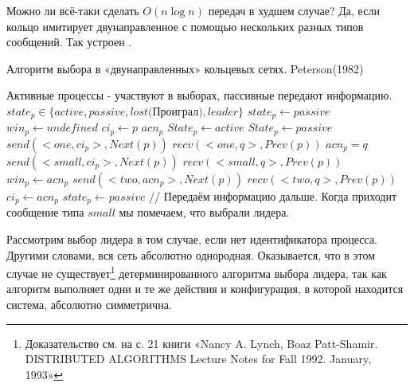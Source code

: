 Можно ли всё-таки сделать $O(n\log n)$ передач в худшем случае? Да, если кольцо имитирует двунаправленное с помощью нескольких разных типов сообщений. Так устроен .
\begin{algorithm}
\caption{Алгоритм выбора в «двунаправленных» кольцевых сетях. Peterson(1982)}
\label{algPeterson}
\begin{algorithmic}
\State Активные процессы - участвуют в выборах, пассивные передают информацию. 
\State $state_p \in \{active, passive, lost\text{(Проиграл)}, leader\}$ 
\State $state_p \gets passive$
\State $win_p \gets undefined$ 
\State $ci_p \gets p$ 
\State $acn_p$ 
    \State $State_p \gets active$
\Else 
    \State $State_p \gets passive$
\EndIf
{}
    \State $send(<one, ci_p>, Next(p))$ 
    \State $recv(<one, q>, Prev(p))$
    \State $acn_p = q$
     
        \State $send(<small, ci_p>, Next(p))$ 
        \State $recv(<small, q>, Prev(p))$ 
        \State $win_p \gets acn_p$
    \Else {}
        \State $send(<two, acn_p>, Next(p))$
        \State $recv(<two, q>, Prev(p))$
         
            \State $ci_p \gets acn_p$
        \Else 
            \State $state_p \gets passive$ 
        \EndIf
    \EndIf
\EndWhile
{} 
    \State // Передаём информацию дальше.
\EndIf
\State Когда приходит сообщение типа $small$ мы помечаем, что выбрали лидера.
\end{algorithmic}
\end{algorithm}

Рассмотрим выбор лидера в том случае, если нет идентификатора процесса. Другими словами, вся сеть абсолютно однородная. Оказывается, что в этом случае не существует\footnote{Доказательство см. на с. 21 книги «Nancy A. Lynch, Boaz Patt-Shamir. DISTRIBUTED ALGORITHMS Lecture Notes for Fall 1992. January, 1993»} детерминированного алгоритма выбора лидера, так как алгоритм выполняет одни и те же действия и конфигурация, в которой находится система, абсолютно симметрична.

